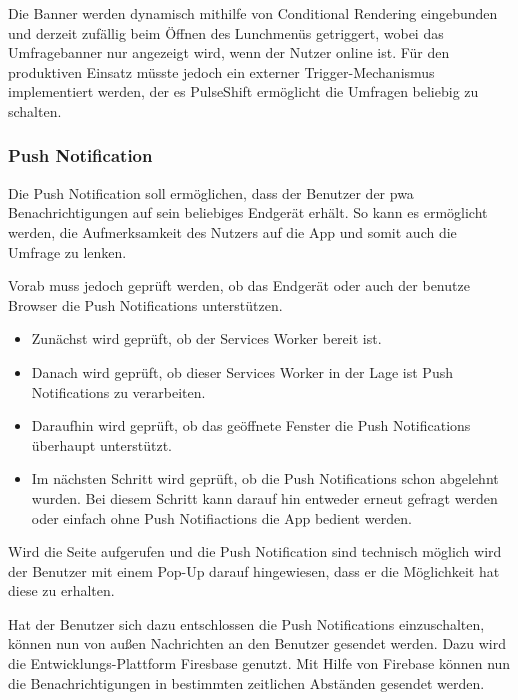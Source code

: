 Die Banner werden dynamisch mithilfe von Conditional Rendering eingebunden und derzeit zufällig beim Öffnen des Lunchmenüs getriggert, wobei das Umfragebanner nur angezeigt wird, wenn der Nutzer online ist. Für den produktiven Einsatz müsste jedoch ein externer Trigger-Mechanismus implementiert werden, der es PulseShift ermöglicht die Umfragen beliebig zu schalten.



\subsubsection{Push Notification}
Die Push Notification soll ermöglichen, dass der Benutzer der \gls{pwa} Benachrichtigungen auf sein beliebiges Endgerät erhält. So kann es ermöglicht werden, die Aufmerksamkeit des Nutzers auf die App und somit auch die Umfrage zu lenken. 

Vorab muss jedoch geprüft werden, ob das Endgerät oder auch der benutze Browser die Push Notifications unterstützen. 

\begin{itemize}
\item Zunächst wird geprüft, ob der Services Worker bereit ist. 
\item Danach wird geprüft, ob dieser Services Worker in der Lage ist Push Notifications zu verarbeiten.
\item Daraufhin wird geprüft, ob das geöffnete Fenster die Push Notifications überhaupt unterstützt.
\item Im nächsten Schritt wird geprüft, ob die Push Notifications schon abgelehnt wurden. Bei diesem Schritt kann darauf hin entweder erneut gefragt werden oder einfach ohne Push Notifiactions die App bedient werden.
\end{itemize} 

Wird die Seite aufgerufen und die Push Notification sind technisch möglich wird der Benutzer mit einem Pop-Up darauf hingewiesen, dass er die Möglichkeit hat diese zu erhalten. 

Hat der Benutzer sich dazu entschlossen die Push Notifications einzuschalten, können nun von außen Nachrichten an den Benutzer gesendet werden. Dazu wird die Entwicklungs-Plattform Firesbase genutzt. Mit Hilfe von Firebase können nun die Benachrichtigungen in bestimmten zeitlichen Abständen gesendet werden.

